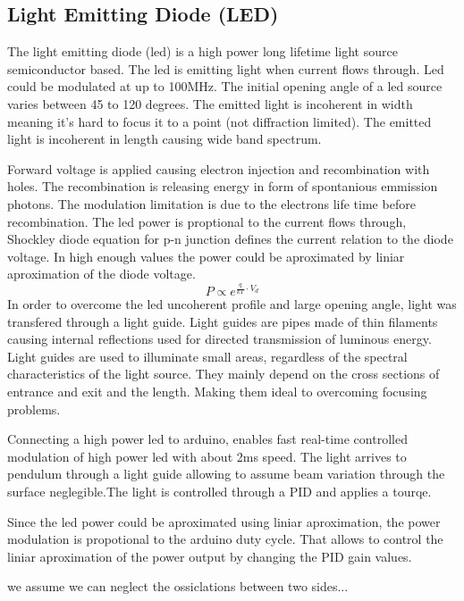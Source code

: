 \documentclass[\main/master.tex]{subfiles}
\begin{document}
\subsection{Light Emitting Diode (LED)}
The light emitting diode (led) is a high power long lifetime light source semiconductor based. The led is emitting light when current flows through. Led could be modulated at up to 100MHz. The initial opening angle of a led source varies between 45 to 120 degrees. The emitted light is incoherent in width meaning it's hard to focus it to a point (not diffraction limited). The emitted light is incoherent in length causing wide band spectrum.
\par
\par
Forward voltage is applied causing electron injection and recombination with holes. The recombination is releasing energy in form of spontanious emmission photons. The modulation limitation is due to the electrons life time before recombination. The led power is proptional to the current flows through, Shockley diode equation for p-n junction defines the current relation to the diode voltage. In high enough values the power could be aproximated by liniar aproximation of the diode voltage.
\begin{equation}
P\propto e^{\frac{q}{kT}\cdot V_d}\label{eqn:energy-mass-equivalence-relation}
\end{equation}
In order to overcome the led uncoherent profile and large opening angle, light was transfered through a light guide. Light guides are pipes made of thin filaments causing internal reflections used for directed transmission of luminous energy. Light guides are used to illuminate small areas, regardless of the spectral characteristics of the light source. They mainly depend on the cross sections of entrance and exit and the length. Making them ideal to overcoming focusing problems.
\par
Connecting a high power led to arduino, enables fast real-time controlled modulation of high power led with about 2ms speed. The light arrives to pendulum through a light guide allowing to assume beam variation through the surface neglegible.The light is controlled through a PID and applies a tourqe.
\par
Since the led power could be aproximated using liniar aproximation, the power modulation is propotional to the arduino duty cycle. That allows to control the liniar aproximation of the power output by changing the PID gain values.  
\par
we assume we can neglect the ossiclations between two sides...
\end{document}
